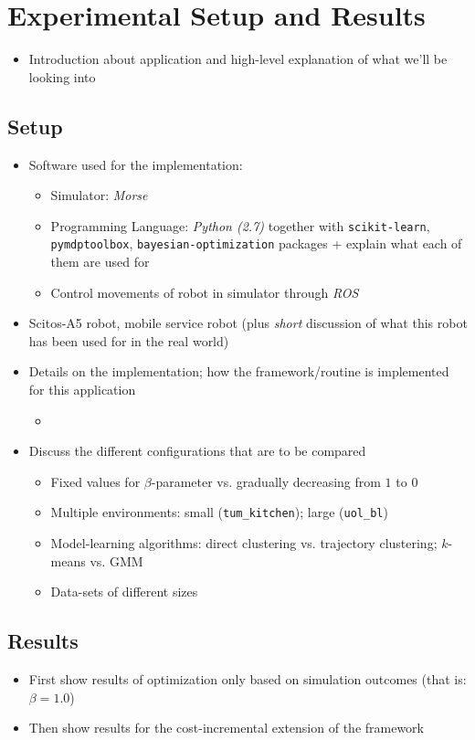 \chapter{Experimental Setup and Results}
\label{ch:experimental-results}

\begin{itemize}
	\item Introduction about application and high-level explanation of what we'll be looking into
\end{itemize}

\section{Setup}
\label{sec:setup}

\begin{itemize}
	\item Software used for the implementation:
	\begin{itemize}
		\item Simulator: \textit{Morse}
		\item Programming Language: \textit{Python (2.7)} together with \texttt{scikit-learn}, \texttt{pymdptoolbox}, \texttt{bayesian-optimization} packages + explain what each of them are used for
		\item Control movements of robot in simulator through \textit{ROS}
	\end{itemize}
	\item Scitos-A5 robot, mobile service robot (plus \textit{short} discussion of what this robot has been used for in the real world)
	\item Details on the implementation; how the framework/routine is implemented for this application
	\begin{itemize}
		\item 
	\end{itemize}
	\item Discuss the different configurations that are to be compared
	\begin{itemize}
		\item Fixed values for $\beta$-parameter vs. gradually decreasing from $1$ to $0$
		\item Multiple environments: small (\texttt{tum\_kitchen}); large (\texttt{uol\_bl})
		\item Model-learning algorithms: direct clustering vs. trajectory clustering; $k$-means vs. GMM
		\item Data-sets of different sizes
	\end{itemize}
\end{itemize}

\section{Results}
\label{sec:results}

\begin{itemize}
	\item First show results of optimization only based on simulation outcomes (that is: $\beta = 1.0$)
	\item Then show results for the cost-incremental extension of the framework
\end{itemize}

